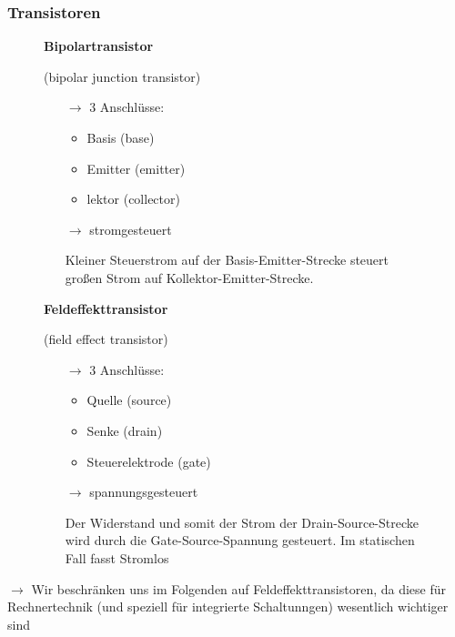 \documentclass[12pt]{report}
\begin{document}
\subsubsection{Transistoren}
\begin{figure}[H]
  \begin{minipage}{0.45\textwidth}
    \textbf{Bipolartransistor}
    \par (bipolar junction transistor)
    \begin{itemize}
      \item[$\rightarrow$] 3 Anschlüsse:
            \begin{itemize}
              \item Basis (base)
              \item Emitter (emitter)
              \item lektor (collector)
            \end{itemize}
      \item[$\rightarrow$] stromgesteuert

            Kleiner Steuerstrom auf der Basis-Emitter-Strecke steuert großen Strom auf Kollektor-Emitter-Strecke.
    \end{itemize}
  \end{minipage}
  \hfill
  \begin{minipage}{0.45\textwidth}
    \textbf{Feldeffekttransistor}
    \par (field effect transistor)
    \begin{itemize}
      \item[$\rightarrow$] 3 Anschlüsse:
            \begin{itemize}
              \item Quelle (source)
              \item Senke (drain)
              \item Steuerelektrode (gate)
            \end{itemize}
      \item[$\rightarrow$] spannungsgesteuert

            Der Widerstand und somit der Strom der Drain-Source-Strecke wird durch die Gate-Source-Spannung gesteuert. Im statischen Fall fasst Stromlos
    \end{itemize}
  \end{minipage}
\end{figure}

$\rightarrow$ Wir beschränken uns im Folgenden auf Feldeffekttransistoren, da diese für Rechnertechnik (und speziell für integrierte Schaltunngen) wesentlich wichtiger sind
\end{document}
